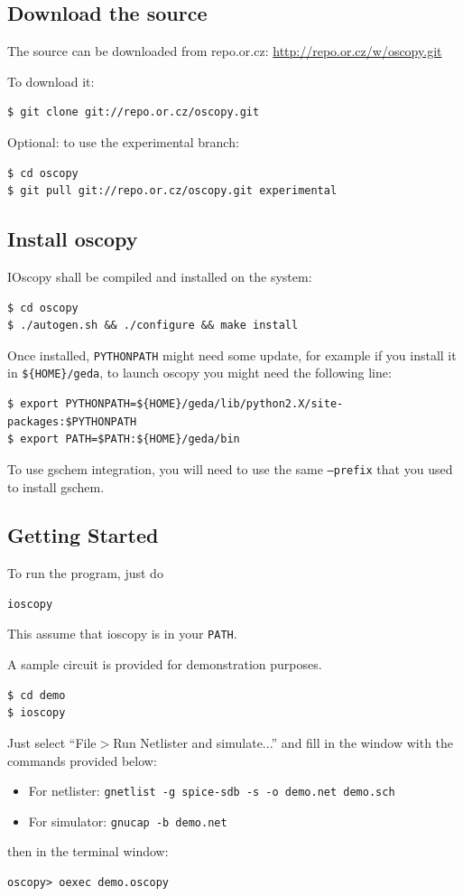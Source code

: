\documentclass[a4paper,11pt]{report}
\begin{document}
\subsection{Download the source}
The source can be downloaded from repo.or.cz: \href{http://repo.or.cz/w/oscopy.git}{http://repo.or.cz/w/oscopy.git}

To download it:
\begin{lstlisting}
$ git clone git://repo.or.cz/oscopy.git
\end{lstlisting} %

Optional: to use the experimental branch:
\begin{lstlisting}
$ cd oscopy
$ git pull git://repo.or.cz/oscopy.git experimental
\end{lstlisting}

\subsection{Install oscopy}
IOscopy shall be compiled and installed on the system:
\begin{lstlisting}
$ cd oscopy
$ ./autogen.sh && ./configure && make install
\end{lstlisting}
Once installed, \texttt{PYTHONPATH} might need some update, for example if you install it in \texttt{\$\{HOME\}/geda}, to launch oscopy you might need the following line:
\begin{lstlisting}
$ export PYTHONPATH=${HOME}/geda/lib/python2.X/site-packages:$PYTHONPATH
$ export PATH=$PATH:${HOME}/geda/bin
\end{lstlisting}
To use gschem integration, you will need to use the same \texttt{--prefix} that you used to install gschem. 

\subsection{Getting Started}
To run the program, just do 
\begin{lstlisting}
ioscopy
\end{lstlisting}
This assume that ioscopy is in your \texttt{PATH}.

A sample circuit is provided for demonstration purposes. 
\begin{lstlisting}
$ cd demo
$ ioscopy
\end{lstlisting}
Just select ``File$>$Run Netlister and simulate...'' and fill in the window with the commands provided below: 
\begin{itemize}
\item For netlister: \lstinline!gnetlist -g spice-sdb -s -o demo.net demo.sch!
\item For simulator: \lstinline!gnucap -b demo.net!
\end{itemize}
then in the terminal window:
\begin{lstlisting}
oscopy> oexec demo.oscopy
\end{lstlisting}
\end{document}
